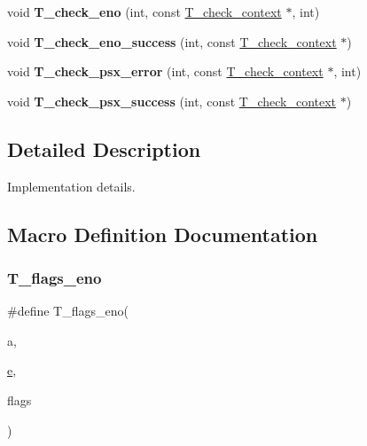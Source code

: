\begin{DoxyCompactItemize}
void {\bfseries T\+\_\+check\+\_\+eno} (int, const \mbox{\hyperlink{structT__check__context}{T\+\_\+check\+\_\+context}} $\ast$, int)
\item 
\mbox{\label{group__RTEMSTestFrameworkImpl_gaa48512d42454324e3ffe04131307c7e2}} 
void {\bfseries T\+\_\+check\+\_\+eno\+\_\+success} (int, const \mbox{\hyperlink{structT__check__context}{T\+\_\+check\+\_\+context}} $\ast$)
\item 
\mbox{\label{group__RTEMSTestFrameworkImpl_ga6b47c47c92506cfbd93c4fde44d79c82}} 
void {\bfseries T\+\_\+check\+\_\+psx\+\_\+error} (int, const \mbox{\hyperlink{structT__check__context}{T\+\_\+check\+\_\+context}} $\ast$, int)
\item 
\mbox{\label{group__RTEMSTestFrameworkImpl_gadca2ab4d997ed698f5e70227f75615c5}} 
void {\bfseries T\+\_\+check\+\_\+psx\+\_\+success} (int, const \mbox{\hyperlink{structT__check__context}{T\+\_\+check\+\_\+context}} $\ast$)
\end{DoxyCompactItemize}


\subsection{Detailed Description}
Implementation details. 



\subsection{Macro Definition Documentation}
\mbox{\label{group__RTEMSTestFrameworkImpl_ga691e72afcd49bca460b7e37bc3bba62c}} 
\subsubsection{\texorpdfstring{T\_flags\_eno}{T\_flags\_eno}}
{\footnotesize\ttfamily \#define T\+\_\+flags\+\_\+eno(\begin{DoxyParamCaption}\item[{}]{a,  }\item[{}]{\mbox{\hyperlink{sun4u_2tte_8h_a8b0b9ed08e0e18920ec2682f48228c27}{e}},  }\item[{}]{flags }\end{DoxyParamCaption})}

